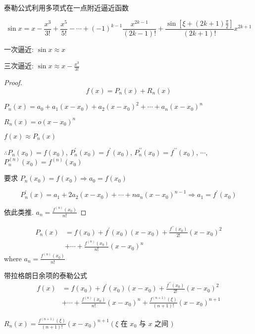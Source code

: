 \begin{example}
    泰勒公式利用多项式在一点附近逼近函数

    $$ \sin x= x-\frac{x^{3}}{3 !}+\frac{x^{5}}{5 !}-\cdots+(-1)^{k-1} \frac{x^{2 k-1}}{(2 k-1) !}+\frac{\sin \left[\xi+(2 k+1) \frac{\pi}{2}\right]}{(2 k+1) !} x^{2 k+1} $$

    一次逼近: $  \sin x \approx x $

    三次逼近: $  \sin x \approx x-\frac{x^{3}}{3 !} $
\end{example}

\begin{proof}
    $$ f(x)=P_{n}(x)+R_{n}(x) $$
    
    $ P_{n}(x)=a_{0}+a_{1}\left(x-x_{0}\right)+a_{2}\left(x-x_{0}\right)^{2}+\cdots+a_{n}\left(x-x_{0}\right)^{n}  $

    $ R_{n}(x)=o\left(x-x_{0}\right)^{n} $

    $ f(x) \approx P_{n}(x) $

    $\therefore  P_{n}\left(x_{0}\right)=f\left(x_{0}\right) $,
    $ P_{n}^{\prime}\left(x_{0}\right)=f^{\prime}\left(x_{0}\right) $,
    $ P_{n}^{\prime \prime}\left(x_{0}\right)=f^{\prime \prime}\left(x_{0}\right) $,
    $ \cdots  $,
    $ P_{n}^{(n)}\left(x_{0}\right)=f^{(n)}\left(x_{0}\right) $

    要求 $ P_{n}\left(x_{0}\right)=f\left(x_{0}\right) \Rightarrow  a_{0}=f\left(x_{0}\right)  $

    $$ P_{n}^{\prime}(x)=a_{1}+2 a_{2}\left(x-x_{0}\right)+\cdots+n a_{n}\left(x-x_{0}\right)^{n-1} \Rightarrow  a_{1}=f^{\prime}\left(x_{0}\right)  $$

    依此类推. $a_{n}=\frac{f^{(n)}\left(x_{0}\right)}{n !} $
\end{proof}

\begin{corollary}[n阶泰勒多项式]
    $$ \begin{aligned} P_{n}(x) &=f\left(x_{0}\right)+f^{\prime}\left(x_{0}\right)\left(x-x_{0}\right)+\frac{f^{\prime \prime}\left(x_{0}\right)}{2 !}\left(x-x_{0}\right)^{2} \\ &+\cdots+\frac{f^{(n)}\left(x_{0}\right)}{n !}\left(x-x_{0}\right)^{n} \end{aligned} $$
    where $a_{n}=\frac{f^{(n)}\left(x_{0}\right)}{n !} $
\end{corollary}

\begin{corollary}[对于高阶余项的公式]
    带拉格朗日余项的泰勒公式
    $$ \begin{aligned} f(x) &=f\left(x_{0}\right)+f^{\prime}\left(x_{0}\right)\left(x-x_{0}\right)+\frac{f^{\prime \prime}\left(x_{0}\right)}{2 !}\left(x-x_{0}\right)^{2} \\ &+\cdots+\frac{f^{(n)}\left(x_{0}\right)}{n !}\left(x-x_{0}\right)^{n}+\frac{f^{(n+1)}(\xi)}{(n+1) !}\left(x-x_{0}\right)^{n+1} \end{aligned} $$

    $ R_{n}(x)=\frac{f^{(n+1)}(\xi)}{(n+1) !}\left(x-x_{0}\right)^{n+1}\left(\xi\right. $ 在 $ x_{0} $ 与 $ x  $ 之间 $ ) $
\end{corollary}

